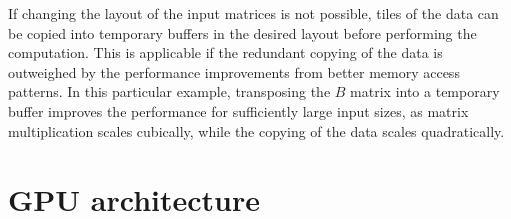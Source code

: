 


If changing the layout of the input matrices is not possible, tiles of the data can be copied into temporary buffers in the desired layout before performing the computation. This is applicable if the redundant copying of the data is outweighed by the performance improvements from better memory access patterns. In this particular example, transposing the $B$ matrix into a temporary buffer improves the performance for sufficiently large input sizes, as matrix multiplication scales cubically, while the copying of the data scales quadratically.


\section{GPU architecture}\label{sec:gpu-architecture}

